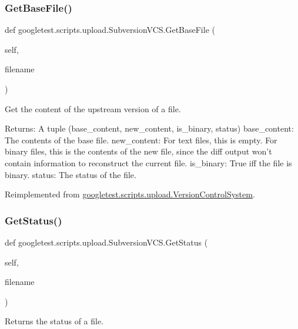 \subsubsection{\texorpdfstring{GetBaseFile()}{GetBaseFile()}}
{\footnotesize\ttfamily def googletest.\+scripts.\+upload.\+Subversion\+V\+C\+S.\+Get\+Base\+File (\begin{DoxyParamCaption}\item[{}]{self,  }\item[{}]{filename }\end{DoxyParamCaption})}

\begin{DoxyVerb}Get the content of the upstream version of a file.

Returns:
  A tuple (base_content, new_content, is_binary, status)
base_content: The contents of the base file.
new_content: For text files, this is empty.  For binary files, this is
  the contents of the new file, since the diff output won't contain
  information to reconstruct the current file.
is_binary: True iff the file is binary.
status: The status of the file.
\end{DoxyVerb}
 

Reimplemented from \mbox{\hyperlink{classgoogletest_1_1scripts_1_1upload_1_1_version_control_system_af04094a3d55158ec8731c57af99eaf4c}{googletest.\+scripts.\+upload.\+Version\+Control\+System}}.

\mbox{\label{classgoogletest_1_1scripts_1_1upload_1_1_subversion_v_c_s_ae11892c2437282c5a7a2f8a61d575b9e}} 
\subsubsection{\texorpdfstring{GetStatus()}{GetStatus()}}
{\footnotesize\ttfamily def googletest.\+scripts.\+upload.\+Subversion\+V\+C\+S.\+Get\+Status (\begin{DoxyParamCaption}\item[{}]{self,  }\item[{}]{filename }\end{DoxyParamCaption})}

\begin{DoxyVerb}Returns the status of a file.\end{DoxyVerb}
 \mbox{\label{classgoogletest_1_1scripts_1_1upload_1_1_subversion_v_c_s_ac112319b31bf62e78d21c4416f5dad25}} 
